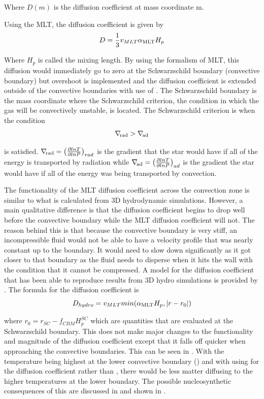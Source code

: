 \documentclass[fleqn,usenatbib]{mnras}
\begin{document}
\noindent Where $D(m)$ is the diffusion coefficient at mass coordinate m. 

Using the MLT, the diffusion coefficient is given by
\begin{equation}
D = \frac{1}{3} v_{MLT} \alpha_{\mathrm{MLT}} H_{p}
\label{eq:diffusion_mlt}
\end{equation}

\noindent Where \alphaMLT$H_{p}$ is called the mixing length. By using the formalism of MLT, this diffusion would immediately go to zero at the Schwarzschild boundary (convective boundary) but overshoot is implemented and the diffusion coefficient is extended outside of the convective boundaries with use of . The Schwarzschild boundary is the mass coordinate where the Schwarzschild criterion, the condition in which the gas will be convectively unstable, is located. The Schwarzschild criterion is when the condition
\begin{equation}
\nabla_{\!\mathrm{rad}} > \nabla_{\!\mathrm{ad}}
\end{equation}

\noindent is satisfied. $\nabla_{\!\mathrm{rad}} = \left({\frac{\partial{lnT}}{\partial{lnP}}}\right)_{rad}$ is the gradient that the star would have if all of the energy is transported by radiation while $\nabla_{\!\mathrm{ad}} = \left({\frac{\partial{lnT}}{\partial{lnP}}}\right)_{ad}$ is the gradient the star would have if all of the energy was being transported by convection. 

The functionality of the MLT diffusion coefficient across the convection zone is similar to what is calculated from 3D hydrodynamic simulations. However, a main qualitative difference is that the diffusion coefficient begins to drop well before the convective boundary while the MLT diffusion coefficient will not. The reason behind this is that because the convective boundary is very stiff, an incompressible fluid would not be able to have a velocity profile that was nearly constant up to the boundary. It would need to slow down significantly as it got closer to that boundary as the fluid needs to disperse when it hits the wall with the condition that it cannot be compressed. A model for the diffusion coefficient that has been able to reproduce results from 3D hydro simulations is provided by \citep{4pi}. The formula for the diffusion coefficient is  
\begin{equation}
D_{hydro} = v_{MLT}min(\alpha_{\mathrm{MLT}} H_{p}, |r - r_{0}|)
\label{eq:Jones}
\end{equation} 

\noindent where $r_{0} = r_{SC} - f_{CBM}H_{p}^{SC}$ which are quantities that are evaluated at the Schwarzschild boundary. This does not make major changes to the functionality and magnitude of the diffusion coefficient except that it falls off quicker when approaching the convective boundaries. This can be seen in . With the temperature being highest at the lower convective boundary () and with using  for the diffusion coefficient rather than , there would be less matter diffusing to the higher temperatures at the lower boundary. The possible nucleosynthetic consequences of this are discussed in  and shown in .
\end{document}
